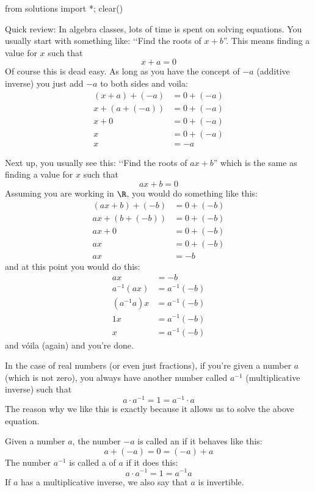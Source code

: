 \begin{python0}
from solutions import *; clear()
\end{python0}

Quick review:
In algebra classes, lots of time is spent on solving equations.
You usually start with something like: \lq\lq Find the roots of
$x + b$''. This means finding a value for $x$ such that 
\[
x + a = 0
\]
Of course this is dead easy.
As long as you have the concept of $-a$ (additive inverse)
you just add $-a$ to both sides and 
voila:
\begin{align*}
(x + a) + (-a) &= 0 + (-a) \\
x + (a + (-a)) &= 0 + (-a) \\
x + 0 &= 0 + (-a) \\
x &= 0 + (-a) \\
x &= -a 
\end{align*}

Next up, you usually see this: \lq\lq Find the roots of $ax + b$''
which is the same as finding a value for $x$ such that 
\[
ax + b = 0
\]
Assuming you are working in $\R$, 
you would do something like this:
\begin{align*}
(ax + b) + (-b) &= 0 + (-b) \\
ax +  (b + (-b)) &= 0 + (-b) \\
ax + 0 &= 0 + (-b) \\
ax &= 0 + (-b) \\
ax &= -b 
\end{align*}
and at this point you would do this:
\begin{align*}
ax &= -b \\
a^{-1}(ax) &= a^{-1}(-b) \\
(a^{-1}a)x &= a^{-1}(-b) \\
1x &= a^{-1}(-b) \\
x &= a^{-1}(-b)
\end{align*}
and v\'oila (again) and you're done.

In the case of real numbers (or even just fractions), 
if you're given a number $a$ (which is not zero), you always have
another number called $a^{-1}$ (multiplicative inverse) such that 
\[
a \cdot a^{-1} = 1 = a^{-1} \cdot a
\]
The reason why we like this is exactly because it allows us to solve
the above equation.

Given a number $a$, the number $-a$ is called an
if it behaves like this:
\[
a + (-a) = 0 = (-a) + a
\]
The number $a^{-1}$ is called a  of $a$
if it does this:
\[
a \cdot a^{-1} = 1 = a^{-1} a
\]
If $a$ has a multiplicative inverse, we also say that $a$ is invertible.

